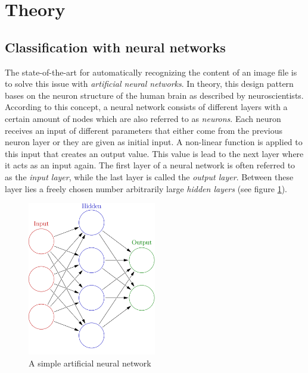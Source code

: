 \documentclass[12pt]{article}
\begin{document}
	\section{Theory}
	\subsection{Classification with neural networks}	
	The state-of-the-art for automatically recognizing the content of an image file is to solve this issue with \textit{artificial neural networks}. In theory, this design pattern bases on the neuron structure of the human brain as described by neuroscientists. According to this concept, a neural network consists of different layers with a certain amount of nodes which are also referred to as \textit{neurons}. Each neuron receives an input of different parameters that either come from the previous neuron layer or they are given as initial input. A non-linear function is applied to this input that creates an output value. This value is lead to the next layer where it acts as an input again. The first layer of a neural network is often referred to as the \textit{input layer}, while the last layer is called the \textit{output layer}. Between these layer lies a freely chosen number arbitrarily large \textit{hidden layers} (see figure \ref{fig:simple-nn}).
	
	\begin{figure}[h!]
		\centering
		\includegraphics[width=0.5\textwidth]{ImagesForReport/simple-nn.png}
		\caption{A simple artificial neural network}
		\label{fig:simple-nn}
	\end{figure}
	
\end{document}
